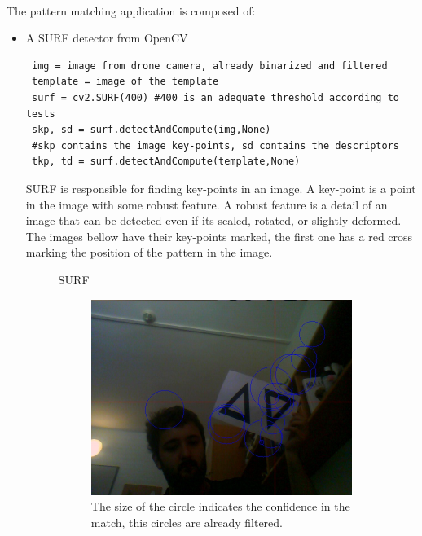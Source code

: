 \documentclass[11pt,twoside,a4paper]{article}
\begin{document}
\paragraph {} The pattern matching application is composed of:
\begin{itemize}
  \item A SURF detector from OpenCV\\
\begin{verbatim}
 img = image from drone camera, already binarized and filtered
 template = image of the template
 surf = cv2.SURF(400) #400 is an adequate threshold according to tests
 skp, sd = surf.detectAndCompute(img,None)
 #skp contains the image key-points, sd contains the descriptors
 tkp, td = surf.detectAndCompute(template,None)
\end{verbatim}
SURF is responsible for finding key-points in an image. A key-point is a point
in the image with some robust feature. A robust feature is a detail of an image
that can be detected even if its scaled, rotated, or slightly deformed.\\
The images bellow have their key-points marked, the first one has a red cross
marking the position of the pattern in the image.
\begin{figure}[hbtp]
  \centering
SURF
\begin{subfigure}{1.00\textwidth}
  \centering
  \includegraphics[width=1.0\linewidth]{image_marked.jpg}
  The size of the circle indicates the confidence in the match, this circles are
already filtered.
\end{subfigure}
\begin{subfigure}{1.00\textwidth}

\end{subfigure}
\end{figure}
\end{itemize}
\end{document}
